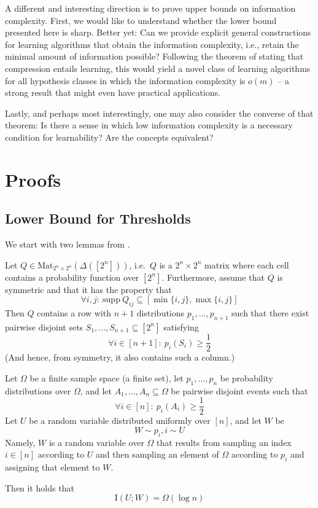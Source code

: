 \documentclass[final,12pt]{colt2018}
\newcommand{\II}[1]{\mathrm{I}\left(#1\right)}
\newcommand{\supp}{\mathrm{supp}}
\begin{document}
A different and interesting direction is to prove upper bounds on information complexity. First, we would like to understand whether the lower bound presented here is sharp. Better yet: Can we provide explicit general constructions for learning algorithms that obtain the information complexity, i.e., retain the minimal amount of information possible? Following the theorem of \cite{bassily2018learners} stating that compression entails learning, this would yield a novel class of learning algorithms for all hypothesis classes in which the information complexity is $o(m)$ -- a strong result that might even have practical applications.

Lastly, and perhaps most interestingly, one may also consider the converse of that theorem: Is there a sense in which low information complexity is a necessary condition for learnability? Are the concepts equivalent?

 


\appendix
 
\section{Proofs}

\subsection{Lower Bound for Thresholds}

\label{sec:LBforT}

We start with two lemmas from \cite{bassily2018learners}.

\begin{lemma}\label{non_deteministic_induction_lemma}
	Let $Q\in\mathrm{Mat}_{2^{n} \times 2^{n}} (\Delta([2^n]))$, i.e.\ $Q$ is a $2^{n} \times 2^{n}$ matrix where each cell contains a probability function over $[2^n]$. Furthermore, assume that $Q$ is symmetric and that it has the property that
	\[
	\forall i,j:\ \supp\: Q_{ij} \subseteq [\min\{i,j\}, \max\{i,j\}] \tag{ii}
	\]
	Then $Q$ contains a row with $n+1$ distributions $p_1, \dots, p_{n+1}$ such that there exist pairwise disjoint sets $S_1, \dots,S_{n+1} \subseteq [2^n]$ satisfying
	\[
	\forall i\in[n+1]:\ p_i(S_i) \geq \frac{1}{2} \tag{iii}
	\]
	(And hence, from symmetry, it also contains such a column.)
\end{lemma}


\begin{lemma}\label{lemma_probabilities_extended}
	Let $\Omega$ be a finite sample space (a finite set), let $p_1, \dots,p_n$ be probability distributions over $\Omega$, and let $A_1, \dots, A_n \subseteq \Omega$ be pairwise disjoint events such that
	\[
	\forall i \in [n]:\ p_i(A_i)\geq \frac{1}{2} \tag{v}
	\]
	Let $U$ be a random variable distributed uniformly over $[n]$, and let $W$ be
	\[
	W \sim p_i, i \sim U
	\] 
	Namely, $W$ is a random variable over $\Omega$ that results from sampling an index $i\in[n]$ according to $U$ and then sampling an element of $\Omega$ according to $p_i$ and assigning that element to $W$.
	
	Then it holds that
	\[
	\II{U; W} = \Omega(\log n)
	\]
\end{lemma}
\end{document}
